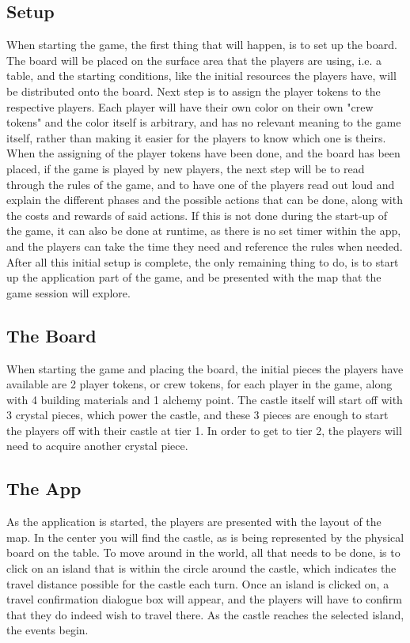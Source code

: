 \subsection{Setup}

When starting the game, the first thing that will happen, is to set up the board. The board will be placed on the surface area that the players are using, i.e. a table, and the starting conditions, like the initial resources the players have, will be distributed onto the board. Next step is to assign the player tokens to the respective players. Each player will have their own color on their own "crew tokens" and the color itself is arbitrary, and has no relevant meaning to the game itself, rather than making it easier for the players to know which one is theirs.
When the assigning of the player tokens have been done, and the board has been placed, if the game is played by new players, the next step will be to read through the rules of the game, and to have one of the players read out loud and explain the different phases and the possible actions that can be done, along with the costs and rewards of said actions. If this is not done during the start-up of the game, it can also be done at runtime, as there is no set timer within the app, and the players can take the time they need and reference the rules when needed.
After all this initial setup is complete, the only remaining thing to do, is to start up the application part of the game, and be presented with the map that the game session will explore.

\subsection{The Board}
When starting the game and placing the board, the initial pieces the players have available are 2 player tokens, or crew tokens, for each player in the game, along with 4 building materials and 1 alchemy point. The castle itself will start off with 3 crystal pieces, which power the castle, and these 3 pieces are enough to start the players off with their castle at tier 1. In order to get to tier 2, the players will need to acquire another crystal piece.


\subsection{The App}
As the application is started, the players are presented with the layout of the map. In the center you will find the castle, as is being represented by the physical board on the table. To move around in the world, all that needs to be done, is to click on an island that is within the circle around the castle, which indicates the travel distance possible for the castle each turn. Once an island is clicked on, a travel confirmation dialogue box will appear, and the players will have to confirm that they do indeed wish to travel there. As the castle reaches the selected island, the events begin. 


